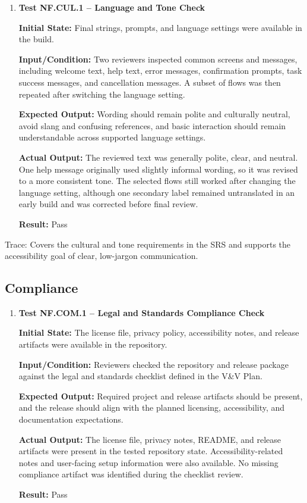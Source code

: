 \documentclass[12pt]{article}
\begin{document}
\begin{enumerate}
    \item \textbf{Test NF.CUL.1 -- Language and Tone Check}
    
    \textbf{Initial State:} Final strings, prompts, and language
    settings were available in the build.
    
    \textbf{Input/Condition:} Two reviewers inspected common screens
    and messages, including welcome text, help text, error messages,
    confirmation prompts, task success messages, and cancellation
    messages. A subset of flows was then repeated after switching the
    language setting.
    
    \textbf{Expected Output:} Wording should remain polite and
    culturally neutral, avoid slang and confusing references, and
    basic interaction should remain understandable across supported
    language settings.
    
    \textbf{Actual Output:} The reviewed text was generally polite,
    clear, and neutral. One help message originally used slightly
    informal wording, so it was revised to a more consistent tone. The
    selected flows still worked after changing the language setting,
    although one secondary label remained untranslated in an early
    build and was corrected before final review.
    
    \textbf{Result:} Pass
\end{enumerate}

\noindent Trace: Covers the cultural and tone requirements in the SRS and
supports the accessibility goal of clear, low-jargon communication.


\subsection{Compliance}

\begin{enumerate}
    \item \textbf{Test NF.COM.1 -- Legal and Standards Compliance Check}
    
    \textbf{Initial State:} The license file, privacy policy,
    accessibility notes, and release artifacts were available in the
    repository.
    
    \textbf{Input/Condition:} Reviewers checked the repository and
    release package against the legal and standards checklist defined
    in the V\&V Plan.
    
    \textbf{Expected Output:} Required project and release artifacts
    should be present, and the release should align with the planned
    licensing, accessibility, and documentation expectations.
    
    \textbf{Actual Output:} The license file, privacy notes, README,
    and release artifacts were present in the tested repository state.
    Accessibility-related notes and user-facing setup information were
    also available. No missing compliance artifact was identified
    during the checklist review.
    
    \textbf{Result:} Pass
\end{enumerate}
\end{document}
